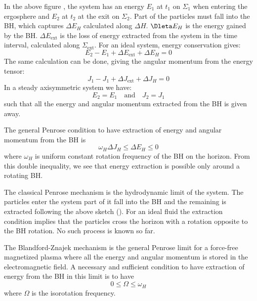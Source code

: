 \documentclass[10pt,a4paper,english]{article}
\begin{document}
In the above figure , the system has an energy $E_1$ at
$t_1$ on $\Sigma_1$ when entering the ergosphere and $E_2$ at $t_2$ at
the exit on $\Sigma_2$. Part of the particles must fall into the BH,
which captures $\Delta E_H$ calculated along $\Delta H$. $\Dleta E_H$
is the energy gained by the BH. $\Delta E_\mathrm{ext}$ is the loss of
energy extracted from the system in the time interval, calculated
along $\Sigma_\mathrm{ext}$. For an ideal system, energy conservation
gives:
\begin{equation}
  E_2 - E_1 + \Delta E_\mathrm{ext} + \Delta E_H = 0
\end{equation}
The same calculation can be done, giving the angular momentum from the
energy tensor:
\begin{equation}
  J_1 - J_1 + \Delta J_\mathrm{ext} + \Delta J_H = 0
\end{equation}
In a steady axisymmetric system we have:
\begin{equation}
  E_2 = E_1 \quad \textrm{and} \quad J_2 = J_1
\end{equation}
such that all the energy and angular momentum extracted from the BH is
given away.

The general Penrose condition to have extraction of energy and angular
momentum from the BH is
\begin{equation}
  \omega_H \Delta J_H \leq \Delta E_H \leq 0
\end{equation}
where $\omega_H$ is uniform constant rotation frequency of the BH on
the horizon. From this double inequality, we see that energy
extraction is possible only around a rotating BH.  

The classical Penrose mechanism is the hydrodynamic limit of the
system. The particles enter the system part of it fall into the BH and
the remaining is extracted following the above sketch
(). For an ideal fluid the extraction condition implies
that the particles cross the horizon with a rotation opposite to the
BH rotation. No such process is known so far.

The Blandford-Znajek mechanism is the general Penrose limit for a
force-free magnetized plasma where all the energy and angular momentum
is stored in the electromagnetic field. A necessary and sufficient
condition to have extraction of energy from the BH in this limit is to
have
\begin{equation}
  0 \leq \Omega \leq \omega_H
\end{equation}
where $\Omega$ is the isorotation frequency.
\end{document}
